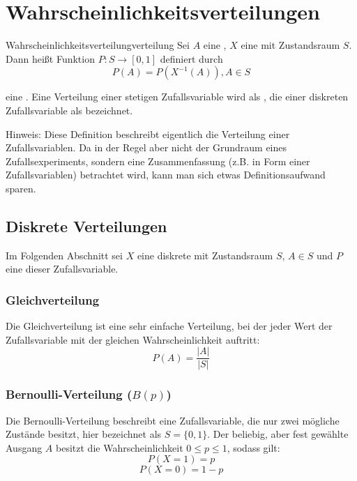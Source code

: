 \chapter{Wahrscheinlichkeitsverteilungen}

\begin{definition}{Wahrscheinlichkeitsverteilung}{verteilung}
Sei $A$ eine , $X$ eine 
mit Zustandsraum $S$. Dann heißt Funktion $P: S \rightarrow [0,1]$ definiert
durch
\[P(A) = P(X^{-1}(A)), A \in S\]

eine . Eine Verteilung einer stetigen
Zufallsvariable wird als , die einer diskreten
Zufallsvariable als  bezeichnet.
\end{definition}

Hinweis: Diese Definition beschreibt eigentlich die Verteilung einer
Zufallsvariablen. Da in der Regel aber nicht der Grundraum eines
Zufallsexperiments, sondern eine Zusammenfassung (z.B. in Form einer
Zufallsvariablen) betrachtet wird, kann man sich etwas Definitionsaufwand
sparen.

\section{Diskrete Verteilungen}

Im Folgenden Abschnitt sei $X$ eine diskrete 
mit Zustandsraum $S$, $A \in S$ und $P$ eine
 dieser Zufallsvariable.


\subsection{Gleichverteilung}

Die Gleichverteilung ist eine sehr einfache Verteilung, bei der jeder Wert der
Zufallsvariable mit der gleichen Wahrscheinlichkeit auftritt:
\[P(A) = \frac{|A|}{|S|}\]


\subsection{Bernoulli-Verteilung ($B(p)$)}

Die Bernoulli-Verteilung beschreibt eine Zufallsvariable, die nur zwei mögliche
Zustände besitzt, hier bezeichnet als $S = \{0,1\}$. Der beliebig, aber fest
gewählte Ausgang $A$ besitzt die Wahrscheinlichkeit $0 \le p \le 1$, sodass
gilt:
\[P(X=1)=p\]
\[P(X=0)=1-p\]


